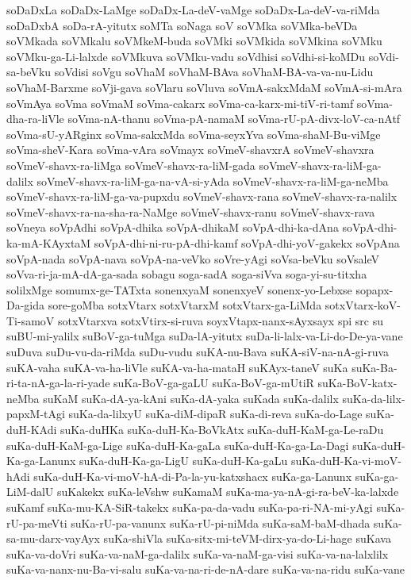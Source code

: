 {soDaDxLa
soDaDx-LaMge
soDaDx-La-deV-vaMge
soDaDx-La-deV-va-riMda
soDaDxbA
soDa-rA-yitutx
soMTa
soNaga
soV
soVMka
soVMka-beVDa
soVMkada
soVMkalu
soVMkeM-buda
soVMki
soVMkida
soVMkina
soVMku
soVMku-ga-Li-lalxde
soVMkuva
soVMku-vadu
soVdhisi
soVdhi-si-koMDu
soVdi-sa-beVku
soVdisi
soVgu
soVhaM
soVhaM-BAva
soVhaM-BA-va-va-nu-Lidu
soVhaM-Barxme
soVji-gava
soVlaru
soVluva
soVmA-sakxMdaM
soVmA-si-mAra
soVmAya
soVma
soVmaM
soVma-cakarx
soVma-ca-karx-mi-tiV-ri-tamf
soVma-dha-ra-liVle
soVma-nA-thanu
soVma-pA-namaM
soVma-rU-pA-divx-loV-ca-nAtf
soVma-sU-yARginx
soVma-sakxMda
soVma-seyxYva
soVma-shaM-Bu-viMge
soVma-sheV-Kara
soVma-vAra
soVmayx
soVmeV-shavxrA
soVmeV-shavxra
soVmeV-shavx-ra-liMga
soVmeV-shavx-ra-liM-gada
soVmeV-shavx-ra-liM-ga-dalilx
soVmeV-shavx-ra-liM-ga-na-vA-si-yAda
soVmeV-shavx-ra-liM-ga-neMba
soVmeV-shavx-ra-liM-ga-va-pupxdu
soVmeV-shavx-rana
soVmeV-shavx-ra-nalilx
soVmeV-shavx-ra-na-sha-ra-NaMge
soVmeV-shavx-ranu
soVmeV-shavx-rava
soVneya
soVpAdhi
soVpA-dhika
soVpA-dhikaM
soVpA-dhi-ka-dAna
soVpA-dhi-ka-mA-KAyxtaM
soVpA-dhi-ni-ru-pA-dhi-kamf
soVpA-dhi-yoV-gakekx
soVpAna
soVpA-nada
soVpA-nava
soVpA-na-veVko
soVre-yAgi
soVsa-beVku
soVsaleV
soVva-ri-ja-mA-dA-ga-sada
sobagu
soga-sadA
soga-siVva
soga-yi-su-titxha
solilxMge
somumx-ge-TATxta
sonenxyaM
sonenxyeV
sonenx-yo-Lebxse
sopapx-Da-gida
sore-goMba
sotxVtarx
sotxVtarxM
sotxVtarx-ga-LiMda
sotxVtarx-koV-Ti-samoV
sotxVtarxva
sotxVtirx-si-ruva
soyxVtapx-nanx-sAyxsayx
spi
src
su
suBU-mi-yalilx
suBoV-ga-tuMga
suDa-lA-yitutx
suDa-li-lalx-va-Li-do-De-ya-vane
suDuva
suDu-vu-da-riMda
suDu-vudu
suKA-nu-Bava
suKA-siV-na-nA-gi-ruva
suKA-vaha
suKA-va-ha-liVle
suKA-va-ha-mataH
suKAyx-taneV
suKa
suKa-Ba-ri-ta-nA-ga-la-ri-yade
suKa-BoV-ga-gaLU
suKa-BoV-ga-mUtiR
suKa-BoV-katx-neMba
suKaM
suKa-dA-ya-kAni
suKa-dA-yaka
suKada
suKa-dalilx
suKa-da-lilx-papxM-tAgi
suKa-da-lilxyU
suKa-diM-dipaR
suKa-di-reva
suKa-do-Lage
suKa-duH-KAdi
suKa-duHKa
suKa-duH-Ka-BoVkAtx
suKa-duH-KaM-ga-Le-raDu
suKa-duH-KaM-ga-Lige
suKa-duH-Ka-gaLa
suKa-duH-Ka-ga-La-Dagi
suKa-duH-Ka-ga-Lanunx
suKa-duH-Ka-ga-LigU
suKa-duH-Ka-gaLu
suKa-duH-Ka-vi-moV-hAdi
suKa-duH-Ka-vi-moV-hA-di-Pa-la-yu-katxshacx
suKa-ga-Lanunx
suKa-ga-LiM-dalU
suKakekx
suKa-leVshw
suKamaM
suKa-ma-ya-nA-gi-ra-beV-ka-lalxde
suKamf
suKa-mu-KA-SiR-takekx
suKa-pa-da-vadu
suKa-pa-ri-NA-mi-yAgi
suKa-rU-pa-meVti
suKa-rU-pa-vanunx
suKa-rU-pi-niMda
suKa-saM-baM-dhada
suKa-sa-mu-darx-vayAyx
suKa-shiVla
suKa-sitx-mi-teVM-dirx-ya-do-Li-hage
suKava
suKa-va-doVri
suKa-va-naM-ga-dalilx
suKa-va-naM-ga-visi
suKa-va-na-lalxlilx
suKa-va-nanx-nu-Ba-vi-salu
suKa-va-na-ri-de-nA-dare
suKa-va-na-ridu
suKa-vane
}
